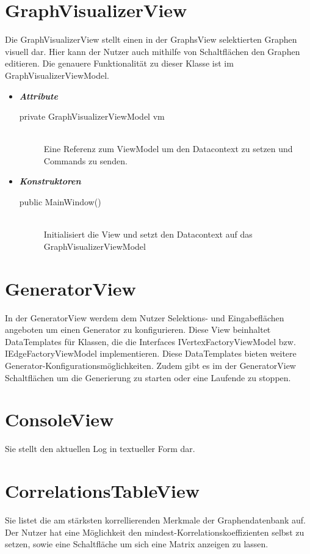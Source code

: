 \documentclass[13pt]{scrreprt}
\begin{document}
	\section{GraphVisualizerView}
	Die GraphVisualizerView stellt einen in der GraphsView selektierten Graphen visuell dar. Hier kann der Nutzer auch mithilfe von Schaltfl\"achen den Graphen editieren. Die genauere Funktionalit\"at zu dieser Klasse ist im GraphVisualizerViewModel.
	\begin{itemize}[label = {$\circ$}]
		\item {\large \textbf{\textit{Attribute}}\par}
		\begin{description}
			\item [private GraphVisualizerViewModel vm] \hfill \\ Eine Referenz zum ViewModel um den Datacontext zu setzen und Commands zu senden.
		\end{description}
		\item {\large \textbf{\textit{Konstruktoren}}\par}
		\begin{description}
			\item [public MainWindow()] \hfill \\ Initialisiert die View und setzt den Datacontext auf das GraphVisualizerViewModel
		\end{description}
	\end{itemize}
	
	\section{GeneratorView}
	In der GeneratorView werdem dem Nutzer Selektions- und Eingabefl\"achen angeboten um einen Generator zu konfigurieren. Diese View beinhaltet DataTemplates f\"ur Klassen, die die Interfaces IVertexFactoryViewModel bzw. IEdgeFactoryViewModel implementieren. Diese DataTemplates bieten weitere Generator-Konfigurationsm\"oglichkeiten. Zudem gibt es im der GeneratorView Schaltfl\"achen um die Generierung zu starten oder eine Laufende zu stoppen.
	\section{ConsoleView}
	Sie stellt den aktuellen Log in textueller Form dar.
	\section{CorrelationsTableView}
	Sie listet die am st\"arksten korrellierenden Merkmale der Graphendatenbank auf. Der Nutzer hat eine M\"oglichkeit den mindest-Korrelationskoeffizienten selbst zu setzen, sowie eine Schaltfl\"ache um sich eine Matrix anzeigen zu lassen.
	
\end{document}
